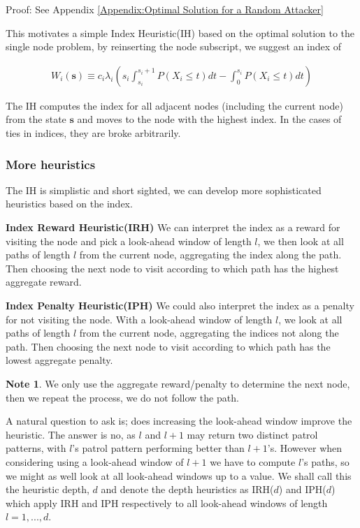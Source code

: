 \documentclass[a4paper,10pt]{article}
\theoremstyle{definition}
\theoremstyle{definition}
\theoremstyle{remark}
\theoremstyle{definition}
\newtheorem*{note}{Note}
\begin{document}
Proof: See Appendix \ref{Appendix:Optimal Solution for a Random Attacker}

This motivates a simple Index Heuristic(IH) based on the optimal solution to the single node problem, by reinserting the node subscript, we suggest an index of

\begin{align*}
W_{i}(\bm{s}) \equiv c_{i} \lambda_{i} \left(s_{i} \int_{s_{i}}^{s_{i}+1} P(X_{i} \leq t) dt - \int_{0}^{s_{i}} P(X_{i} \leq t) dt \right)
\end{align*}

The IH computes the index for all adjacent nodes (including the current node) from the state $\bm{s}$ and moves to the node with the highest index. In the cases of ties in indices, they are broke arbitrarily.

\subsubsection{More heuristics}
The IH is simplistic and short sighted, we can develop more sophisticated heuristics based on the index.

\textbf{Index Reward Heuristic(IRH)}
We can interpret the index as a reward for visiting the node and pick a look-ahead window of length $l$, we then look at all paths of length $l$ from the current node, aggregating the index along the path. Then choosing the next node to visit according to which path has the highest aggregate reward.

\textbf{Index Penalty Heuristic(IPH)}
We could also interpret the index as a penalty for not visiting the node. With a look-ahead window of length $l$, we look at all paths of length $l$ from the current node, aggregating the indices not along the path. Then choosing the next node to visit according to which path has the lowest aggregate penalty. 

\begin{note}
We only use the aggregate reward/penalty to determine the next node, then we repeat the process, we do not follow the path.
\end{note}

A natural question to ask is; does increasing the look-ahead window improve the heuristic. The answer is no, as $l$ and $l+1$ may return two distinct patrol patterns, with $l$'s patrol pattern performing better than $l+1$'s. However when considering using a look-ahead window of $l+1$ we have to compute $l$'s paths, so we might as well look at all look-ahead windows up to a value. We shall call this the heuristic depth, $d$ and denote the depth heuristics as IRH($d$) and IPH($d$) which apply IRH and IPH respectively to all look-ahead windows of length $l=1,...,d$.
\end{document}
